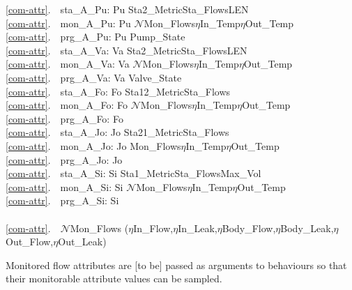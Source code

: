 \ref{com-attr}.\ \ sta\_A\_Pu: Pu {\RIGHTARROW} Sta2\_Metric{\TIMES}Sta\_Flows{\TIMES}LEN{\TIMES}{\DOTDOTDOT}\\
\ref{com-attr}.\ \ mon\_A\_Pu: Pu {\RIGHTARROW} $\mathcal{N}$Mon\_Flows{\TIMES}$\eta$In\_Temp{\TIMES}$\eta$Out\_Temp{\TIMES}{\DOTDOTDOT}\\
\ref{com-attr}.\ \ prg\_A\_Pu: Pu {\RIGHTARROW} Pump\_State{\TIMES}{\DOTDOTDOT} \\
\ref{com-attr}.\ \ sta\_A\_Va: Va {\RIGHTARROW} Sta2\_Metric{\TIMES}Sta\_Flows{\TIMES}LEN{\TIMES}{\DOTDOTDOT}\\
\ref{com-attr}.\ \ mon\_A\_Va: Va {\RIGHTARROW} $\mathcal{N}$Mon\_Flows{\TIMES}$\eta$In\_Temp{\TIMES}$\eta$Out\_Temp{\TIMES}{\DOTDOTDOT}\\
\ref{com-attr}.\ \ prg\_A\_Va: Va {\RIGHTARROW} Valve\_State{\TIMES}{\DOTDOTDOT} \\
\ref{com-attr}.\ \ sta\_A\_Fo: Fo {\RIGHTARROW} Sta12\_Metric{\TIMES}Sta\_Flows{\TIMES}{\DOTDOTDOT}\\
\ref{com-attr}.\ \ mon\_A\_Fo: Fo {\RIGHTARROW} $\mathcal{N}$Mon\_Flows{\TIMES}$\eta$In\_Temp{\TIMES}$\eta$Out\_Temp{\TIMES}{\DOTDOTDOT} \\
\ref{com-attr}.\ \ prg\_A\_Fo: Fo {\RIGHTARROW} {\DOTDOTDOT} \\
\ref{com-attr}.\ \ sta\_A\_Jo: Jo {\RIGHTARROW} Sta21\_Metric{\TIMES}Sta\_Flows{\TIMES}{\DOTDOTDOT}\\
\ref{com-attr}.\ \ mon\_A\_Jo: Jo {\RIGHTARROW} Mon\_Flows{\TIMES}$\eta$In\_Temp{\TIMES}$\eta$Out\_Temp{\TIMES}{\DOTDOTDOT}\\
\ref{com-attr}.\ \ prg\_A\_Jo: Jo {\RIGHTARROW} {\DOTDOTDOT} \\
\ref{com-attr}.\ \ sta\_A\_Si: Si {\RIGHTARROW} Sta1\_Metric{\TIMES}Sta\_Flows{\TIMES}Max\_Vol{\TIMES}{\DOTDOTDOT}\\
\ref{com-attr}.\ \ mon\_A\_Si: Si {\RIGHTARROW} $\mathcal{N}$Mon\_Flows{\TIMES}$\eta$In\_Temp{\TIMES}$\eta$Out\_Temp{\TIMES}{\DOTDOTDOT}\\
\ref{com-attr}.\ \ prg\_A\_Si: Si {\RIGHTARROW} {\DOTDOTDOT}\\
\\
\ref{com-attr}.\ \ $\mathcal{N}$Mon\_Flows {\IS} ($\eta$In\_Flow,$\eta$In\_Leak,$\eta$Body\_Flow,$\eta$Body\_Leak,$\eta$Out\_Flow,$\eta$Out\_Leak)
\ep

\noindent
\begynd
\pind Monitored flow attributes
\begynd
\pind are [to be] passed as arguments to behaviours 
\pind so that their monitorable attribute values can be sampled.
\afslut
\afslut

